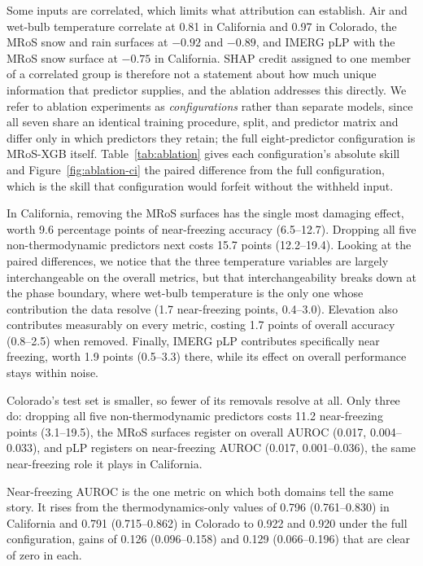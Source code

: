 \documentclass[twocol]{ametsocV6.1} %
\begin{document}
Some inputs are correlated, which limits what attribution can
establish. Air and wet-bulb temperature correlate at 0.81 in California
and 0.97 in Colorado, the MRoS snow and rain surfaces at $-0.92$ and
$-0.89$, and IMERG pLP with the MRoS snow surface at $-0.75$ in
California. SHAP credit assigned to one member of a correlated group is
therefore not a statement about how much unique information that
predictor supplies, and the ablation addresses this directly. We 
refer to ablation experiments as \emph{configurations} rather than separate models,
since all seven share an identical training procedure, split, and
predictor matrix and differ only in which predictors they retain; the
full eight-predictor configuration is MRoS-XGB itself.
Table~\ref{tab:ablation} gives each configuration's absolute skill and
Figure~\ref{fig:ablation-ci} the paired difference from the full
configuration, which is the skill that configuration would forfeit
without the withheld input.

In California, removing the MRoS surfaces has the single most damaging effect, worth 9.6
percentage points of near-freezing accuracy (6.5--12.7). Dropping
all five non-thermodynamic predictors next costs 15.7 points (12.2--19.4). 
Looking at the paired differences, we notice that the three temperature variables are
largely interchangeable on the overall metrics, but that
interchangeability breaks down at the phase boundary, where wet-bulb
temperature is the only one whose contribution the data resolve (1.7
near-freezing points, 0.4--3.0). Elevation also contributes
measurably on every metric, costing 1.7 points of overall accuracy
(0.8--2.5) when removed. Finally, IMERG pLP contributes specifically near
freezing, worth 1.9 points (0.5--3.3) there, while its effect on 
overall performance stays within noise.

Colorado's test set is smaller, so fewer of its removals resolve at all.
Only three do: dropping all five non-thermodynamic predictors costs 11.2
near-freezing points (3.1--19.5), the MRoS surfaces register on overall
AUROC (0.017, 0.004--0.033), and pLP registers on near-freezing AUROC
(0.017, 0.001--0.036), the same near-freezing role it plays in
California.

Near-freezing AUROC is the one metric on which both domains tell the
same story. It rises from the thermodynamics-only values of 0.796
(0.761--0.830) in California and 0.791 (0.715--0.862) in Colorado to
0.922 and 0.920 under the full configuration, gains of 0.126
(0.096--0.158) and 0.129 (0.066--0.196) that are clear of zero in each.
\end{document}
